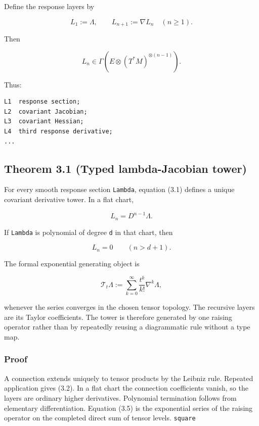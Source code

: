 Define the response layers by

\[
L_1:=\Lambda,
\qquad
L_{n+1}:=\nabla L_n
\quad(n\ge1).
\tag{3.1}
\]

Then

\[
L_n\in
\Gamma\!\left(
E\otimes(T^*M)^{\otimes(n-1)}
\right).
\tag{3.2}
\]

Thus:

\begin{verbatim}
L1  response section;
L2  covariant Jacobian;
L3  covariant Hessian;
L4  third response derivative;
...
\end{verbatim}

\hypertarget{theorem-3.1-typed-lambda-jacobian-tower}{%
\subsection{Theorem 3.1 (Typed lambda-Jacobian tower)}\label{theorem-3.1-typed-lambda-jacobian-tower}}

For every smooth response section \texttt{Lambda}, equation (3.1) defines a unique
covariant derivative tower. In a flat chart,

\[
L_n=D^{n-1}\Lambda.
\tag{3.3}
\]

If \texttt{Lambda} is polynomial of degree \texttt{d} in that chart, then

\[
L_n=0
\qquad(n>d+1).
\tag{3.4}
\]

The formal exponential generating object is

\[
\boxed{
\mathcal T_t\Lambda
:=
\sum_{k=0}^{\infty}
\frac{t^k}{k!}\nabla^k\Lambda,
}
\tag{3.5}
\]

whenever the series converges in the chosen tensor topology. The recursive
layers are its Taylor coefficients. The tower is therefore generated by one
raising operator rather than by repeatedly reusing a diagrammatic rule without
a type map.

\hypertarget{proof}{%
\subsubsection{Proof}\label{proof}}

A connection extends uniquely to tensor products by the Leibniz rule. Repeated
application gives (3.2). In a flat chart the connection coefficients vanish,
so the layers are ordinary higher derivatives. Polynomial termination follows
from elementary differentiation. Equation (3.5) is the exponential series of
the raising operator on the completed direct sum of tensor levels. \texttt{square}

